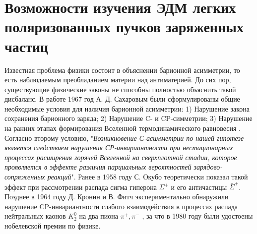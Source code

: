 
	\chapter{Возможности изучения ЭДМ легких поляризованных пучков заряженных частиц}\label{ch:EDM}
 
\par Известная проблема физики состоит в объяснении барионной асимметрии, то есть наблюдаемым преобладанием материи над антиматерией. До сих пор, существующие физические законы не способны полностью объяснить такой дисбаланс. В работе 1967 год А. Д. Сахаровым были сформулированы общие необходимые условия для наличия барионной асимметрии: 1) Нарушение закона сохранения барионного заряда; 2) Нарушение C- и CP-симметрии; 3) Нарушение на ранних этапах формирования Вселенной термодинамического равновесия \cite{sakharov}. Согласно второму условию, "\textit{Возникновение С-асимметрии по нашей гипотезе является следствием нарушения СР-инвариантности при нестационарных процессах расширения горячей Вселенной на сверхплотной стадии, которое проявляется в эффекте различия парциальных вероятностей зарядово-сопряженных реакций}".  Ранее в 1958 году С. Окубо теоретически показал такой эффект при рассмотрении распада сигма гиперона $\Sigma^{+}$ и его античастицы $\bar{\Sigma}^{+}$. Позднее в 1964 году Д. Кронин и В. Фитч экспериментально обнаружили нарушение CP-инвариантности слабого взаимодействия в процессах распада нейтральных каонов $K_{2}^{0}$ на два пиона $\pi^{+}, \pi^{-}$ \cite{CP}, за что в 1980 году были удостоены нобелевской премии по физике. 

